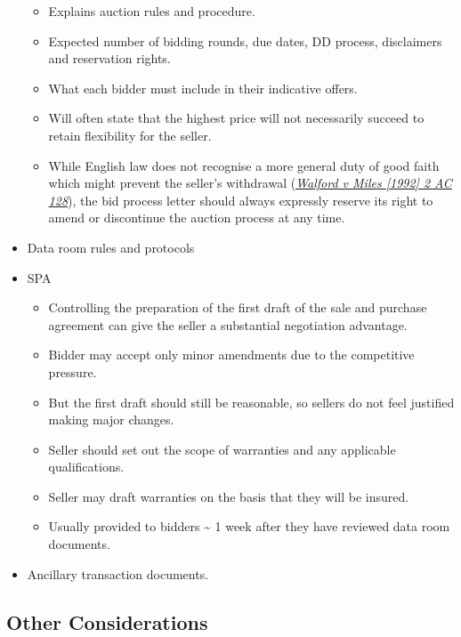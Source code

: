 \documentclass[
]{article}
\providecommand{\tightlist}{%
  \setlength{\itemsep}{0pt}\setlength{\parskip}{0pt}}
\begin{document}
\begin{itemize}
  \begin{itemize}
  \tightlist
  \item
    Explains auction rules and procedure.
  \item
    Expected number of bidding rounds, due dates, DD process,
    disclaimers and reservation rights.
  \item
    What each bidder must include in their indicative offers.
  \item
    Will often state that the highest price will not necessarily succeed
    to retain flexibility for the seller.
  \item
    While English law does not recognise a more general duty of good
    faith which might prevent the seller's withdrawal
    (\emph{\href{https://uk.practicallaw.thomsonreuters.com/D-009-7961?originationContext=document\&transitionType=PLDocumentLink\&contextData=(sc.Default)\&ppcid=e6c4099f36904665b8e4b53211f9bb58}{Walford
    v Miles {[}1992{]} 2 AC 128}}), the bid process letter should always
    expressly reserve its right to amend or discontinue the auction
    process at any time.
  \end{itemize}
\item
  Data room rules and protocols
\item
  SPA

  \begin{itemize}
  \tightlist
  \item
    Controlling the preparation of the first draft of the sale and
    purchase agreement can give the seller a substantial negotiation
    advantage.
  \item
    Bidder may accept only minor amendments due to the competitive
    pressure.
  \item
    But the first draft should still be reasonable, so sellers do not
    feel justified making major changes.
  \item
    Seller should set out the scope of warranties and any applicable
    qualifications.
  \item
    Seller may draft warranties on the basis that they will be insured.
  \item
    Usually provided to bidders \textasciitilde{} 1 week after they have
    reviewed data room documents.
  \end{itemize}
\item
  Ancillary transaction documents.
\end{itemize}

\hypertarget{other-considerations}{%
\subsection{Other Considerations}\label{other-considerations}}
\end{document}
